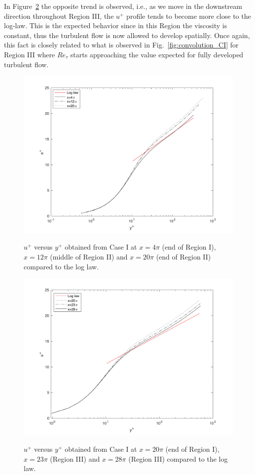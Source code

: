 \documentclass[twocolumn,10pt]{asme2e}
\begin{document}
In Figure~\ref{fig:log_law_CI_downstream} the opposite trend is observed, i.e., as we move in the downstream direction throughout Region III, the \(u^+\) profile tends to become more close to the log-law. This is the expected behavior since in this Region the viscosity is constant, thus the turbulent flow is now allowed to develop spatially. Once again, this fact is closely related to what is observed in Fig.~\ref{fig:convolution_CI} for Region III where  \(Re_{\tau}\) starts approaching the value expected for fully developed turbulent flow.

\begin{figure}[t]
\centering
\scalebox{0.5}
{\includegraphics{log_law_CI_upstream.pdf}}
\caption{\(u^+\) versus \(y^+\) obtained from Case I at \(x=4{\pi}\) (end of Region I), \(x=12{\pi}\) (middle of Region II) and \(x=20{\pi}\) (end of Region II) compared to the log law.}
\label{fig:log_law_CI_upstream}
\end{figure}

\begin{figure}[t]
\centering
\scalebox{0.5}
{\includegraphics{log_law_CI_downstream.pdf}}
\caption{\(u^+\) versus \(y^+\) obtained from Case I at \(x=20{\pi}\) (end of Region I), \(x=23{\pi}\) (Region III) and \(x=28{\pi}\) (Region III) compared to the log law.}
\label{fig:log_law_CI_downstream}
\end{figure}
\end{document}
